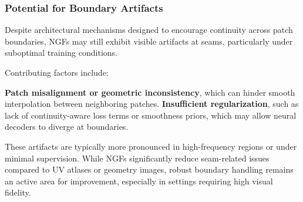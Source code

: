 \subsubsection{Potential for Boundary Artifacts}

Despite architectural mechanisms designed to encourage continuity across patch boundaries, NGFs may still exhibit visible artifacts at seams, particularly under suboptimal training conditions. 

Contributing factors include: 

\textbf{Patch misalignment or geometric inconsistency}, which can hinder smooth interpolation between neighboring patches. 
\textbf{Insufficient regularization}, such as lack of continuity-aware loss terms or smoothness priors, which may allow neural decoders to diverge at boundaries. 

These artifacts are typically more pronounced in high-frequency regions or under minimal supervision. 
While NGFs significantly reduce seam-related issues compared to UV atlases or geometry images, robust boundary handling remains an active area for improvement, especially in settings requiring high visual fidelity. 
